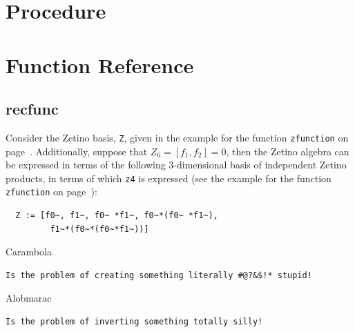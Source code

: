 \documentclass[11pt,letterpaper,twoside]{report}%
\begin{document}
\section{Procedure}

\section{Function Reference}
\frefex

\subsection{recfunc}\label{ss:recfunc}
\begin{fref}
Consider the Zetino basis, \verb|Z|, given in the example for the
function \verb|zfunction| on page~\pageref{ss:zfunction}.  
Additionally, suppose that $Z_6=[f_1,f_2]=0$, then the Zetino algebra 
can be expressed in terms of the following 3-dimensional basis of 
independent Zetino products, in terms of which \verb|z4| is expressed 
(see the example for the function \verb|zfunction| on 
page~\pageref{ss:zfunction}): 
\begin{verbatim}
  Z := [f0~, f1~, f0~ *f1~, f0~*(f0~ *f1~),
         f1~*(f0~*(f0~*f1~))]
\end{verbatim}
\efverbatim
{}
Carambola
\begin{verbatim}
Is the problem of creating something literally #@?&$!* stupid!
\end{verbatim}
\efverbatim
\bfverbatim{}
Alobmarac
\begin{verbatim}
Is the problem of inverting something totally silly!
\end{verbatim}
\efverbatim
\end{fref}


\begin{fref}%
%
%
%
%
\end{fref}
\end{document}

